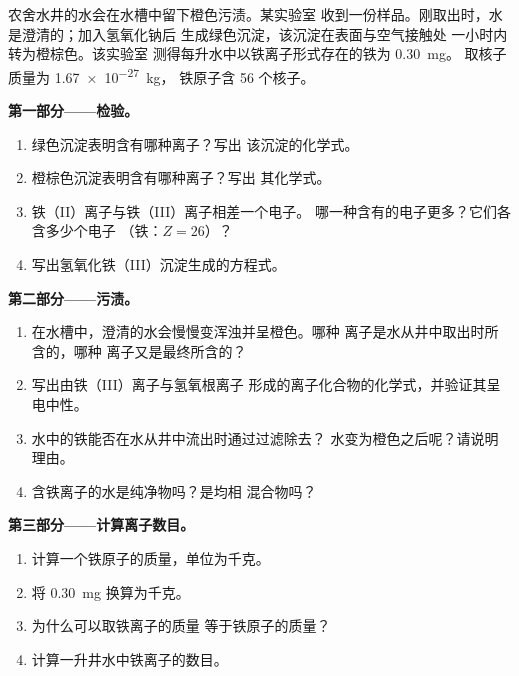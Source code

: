 \begin{problem}
\label{pb:g9:ions:1}
农舍水井的水会在水槽中留下橙色污渍。某实验室
收到一份样品。刚取出时，水是澄清的；加入氢氧化钠后
生成绿色沉淀，该沉淀在表面与空气接触处
一小时内转为橙棕色。该实验室
测得每升水中以铁离子形式存在的铁为 \qty{0.30}{mg}。
取核子质量为 \qty{1.67e-27}{kg}，
铁原子含 56 个核子。

\medskip
\noindent\textbf{第一部分——检验。}
\begin{enumerate}
  \item 绿色沉淀表明含有哪种离子？写出
        该沉淀的化学式。
  \item 橙棕色沉淀表明含有哪种离子？写出
        其化学式。
  \item 铁（II）离子与铁（III）离子相差一个电子。
        哪一种含有的电子更多？它们各含多少个电子
        （铁：$Z = 26$）？
  \item 写出氢氧化铁（III）沉淀生成的方程式。
\end{enumerate}

\medskip
\noindent\textbf{第二部分——污渍。}
\begin{enumerate}[resume]
  \item 在水槽中，澄清的水会慢慢变浑浊并呈橙色。哪种
        离子是水从井中取出时所含的，哪种
        离子又是最终所含的？
  \item 写出由铁（III）离子与氢氧根离子
        形成的离子化合物的化学式，并验证其呈电中性。
  \item 水中的铁能否在水从井中流出时通过过滤除去？
        水变为橙色之后呢？请说明理由。
  \item 含铁离子的水是纯净物吗？是均相
        混合物吗？
\end{enumerate}

\medskip
\noindent\textbf{第三部分——计算离子数目。}
\begin{enumerate}[resume]
  \item 计算一个铁原子的质量，单位为千克。
  \item 将 \qty{0.30}{mg} 换算为千克。
  \item 为什么可以取铁离子的质量
        等于铁原子的质量？
  \item 计算一升井水中铁离子的数目。
\end{enumerate}
\end{problem}
